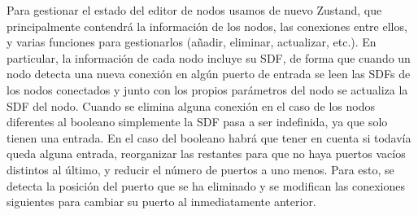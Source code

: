 Para gestionar el estado del editor de nodos usamos de nuevo Zustand, que principalmente contendrá la información de los nodos, las conexiones entre ellos, y varias funciones para gestionarlos (añadir, eliminar, actualizar, etc.). En particular, la información de cada nodo incluye su SDF, de forma que cuando un nodo detecta una nueva conexión en algún puerto de entrada se leen las SDFs de los nodos conectados y junto con los propios parámetros del nodo se actualiza la SDF del nodo. Cuando se elimina alguna conexión en el caso de los nodos diferentes al booleano simplemente la SDF pasa a ser indefinida, ya que solo tienen una entrada. En el caso del booleano habrá que tener en cuenta si todavía queda alguna entrada, reorganizar las restantes para que no haya puertos vacíos distintos al último, y reducir el número de puertos a uno menos. Para esto, se detecta la posición del puerto que se ha eliminado y se modifican las conexiones siguientes para cambiar su puerto al inmediatamente anterior. 
